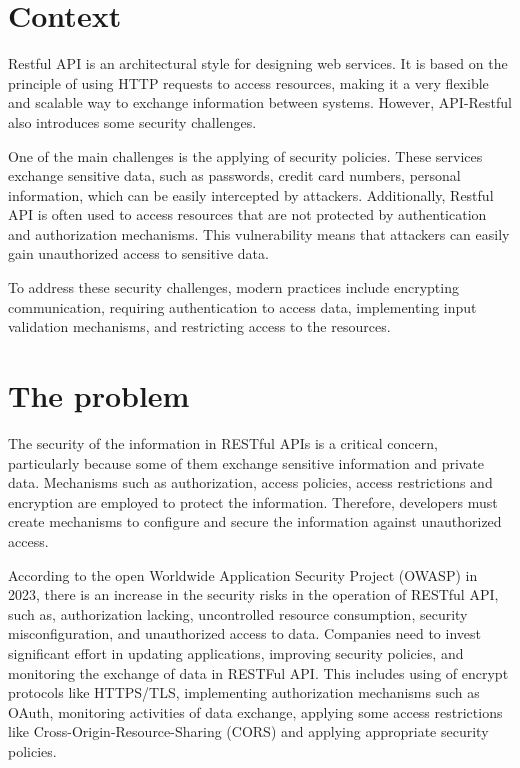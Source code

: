 \section{Context}

Restful API is an architectural style for designing web services. It is based on the principle of using HTTP requests to access resources, making it a very flexible and scalable way to exchange information between systems. However, API-Restful also introduces some security challenges.

One of the main challenges is the applying of security policies. These services exchange sensitive data, such as passwords, credit card numbers, personal information, which can be easily intercepted by attackers. Additionally, Restful API is often used to access resources that are not protected by authentication and authorization mechanisms. This vulnerability means that attackers can easily gain unauthorized access to sensitive data.

To address these security challenges, modern practices include encrypting communication, requiring authentication to access data, implementing input validation mechanisms, and restricting access to the resources.

\section{The problem}

The security of the information in RESTful APIs is a critical concern, particularly because some of them exchange sensitive information and private data. Mechanisms such as authorization, access policies, access restrictions and encryption are employed to protect the information. Therefore, developers must create mechanisms to configure and secure the information against unauthorized access.

According to the open Worldwide Application Security Project (OWASP) in 2023, there is an increase in the security risks in the operation of RESTful API, such as, authorization lacking, uncontrolled resource consumption, security misconfiguration, and unauthorized access to data. Companies need to invest significant effort in updating applications, improving security policies, and monitoring the exchange of data in RESTFul API. This includes using of encrypt protocols like HTTPS/TLS, implementing authorization mechanisms such as OAuth, monitoring activities of data exchange, applying some access restrictions like Cross-Origin-Resource-Sharing (CORS) and applying appropriate security policies\cite{Riggs2023}.

